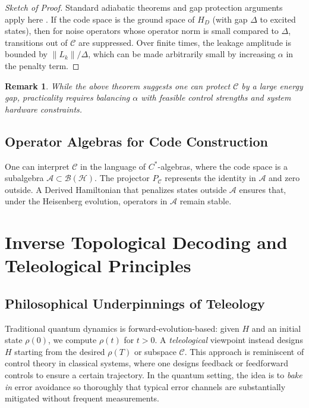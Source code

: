 \documentclass[11pt]{article}
\newtheorem{remark}{Remark}[section]
\begin{document}
\begin{proof}[Sketch of Proof]
Standard adiabatic theorems and gap protection arguments apply here \cite{JansenRuskai, HastingsLiebRobinson}. If the code space is the ground space of $H_D$ (with gap $\Delta$ to excited states), then for noise operators whose operator norm is small compared to $\Delta$, transitions out of $\mathcal{C}$ are suppressed. Over finite times, the leakage amplitude is bounded by $\|L_k\| / \Delta$, which can be made arbitrarily small by increasing $\alpha$ in the penalty term.
\end{proof}

\begin{remark}
While the above theorem suggests one can protect $\mathcal{C}$ by a large energy gap, practicality requires balancing $\alpha$ with feasible control strengths and system hardware constraints.
\end{remark}

\subsection{Operator Algebras for Code Construction}
One can interpret $\mathcal{C}$ in the language of $C^*$-algebras, where the code space is a subalgebra $\mathcal{A} \subset \mathcal{B}(\mathcal{H})$. The projector $P_{\mathcal{C}}$ represents the identity in $\mathcal{A}$ and zero outside. A Derived Hamiltonian that penalizes states outside $\mathcal{A}$ ensures that, under the Heisenberg evolution, operators in $\mathcal{A}$ remain stable.

\section{Inverse Topological Decoding and Teleological Principles}
\label{sec:teleology}

\subsection{Philosophical Underpinnings of Teleology}
Traditional quantum dynamics is forward-evolution-based: given $H$ and an initial state $\rho(0)$, we compute $\rho(t)$ for $t>0$. A \emph{teleological} viewpoint instead designs $H$ starting from the desired $\rho(T)$ or subspace $\mathcal{C}$. This approach is reminiscent of control theory in classical systems, where one designs feedback or feedforward controls to ensure a certain trajectory. In the quantum setting, the idea is to \emph{bake in} error avoidance so thoroughly that typical error channels are substantially mitigated without frequent measurements.
\end{document}
